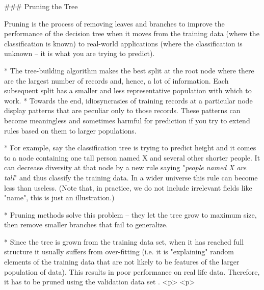 

### Pruning the Tree

Pruning is the process of removing leaves and branches to improve the performance of the decision tree when it moves from the training data (where the classification is known) to real-world applications (where the classification is unknown -- it is what you are trying to predict). 



* The tree-building algorithm makes the best split at the root node where there are the largest number of records and, hence, a lot of information. Each subsequent split has a smaller and less representative population with which to work. 
* Towards the end, idiosyncrasies of training records at a particular node display patterns that are peculiar only to those records. These patterns can become meaningless and sometimes harmful for prediction if you try to extend rules based on them to larger populations.

* For example, say the classification tree is trying to predict height and it comes to a node containing one tall person named X and several other shorter people. It can decrease diversity at that node by a new rule saying "\textit{people named X are tall}" and thus classify the training data. In a wider universe this rule can become less than useless. (Note that, in practice, we do not include irrelevant fields like "name", this is just an illustration.)

* Pruning methods solve this problem -- they let the tree grow to maximum size, then remove smaller branches that fail to generalize.

* Since the tree is grown from the training data set, when it has reached full structure it usually suffers from over-fitting (i.e. it is "explaining" random elements of the training data that are not likely to be features of the larger population of data). This results in poor performance on real life data. Therefore, it has to be pruned using the validation data set .
<p>
<p>
